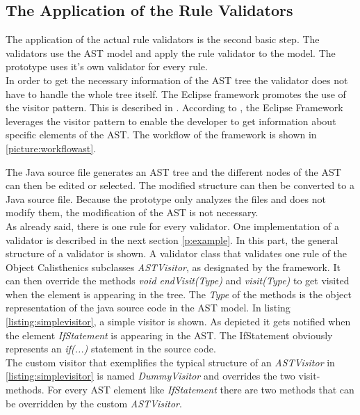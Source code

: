 \subsection*{The Application of the Rule Validators}
\label{astvisitorexample}
The application of the actual rule validators is the second basic step. The validators use the \ac{AST} model and apply the rule validator to the model. The prototype uses it's own validator for every rule. 
\\

In order to get the necessary information of the \ac{AST} tree the validator does not have to handle the whole tree itself. The Eclipse framework promotes the use of the visitor pattern. This is described in \cite[p. 366]{gof}. According to \cite{eclipseast}, the Eclipse Framework leverages the visitor pattern to enable the developer to get information about specific elements of the \ac{AST}. The workflow of the framework is shown in \ref{picture:workflowast}. 

The Java source file generates an \ac{AST} tree and the different nodes of the \ac{AST} can then be edited or selected. The modified structure can then be converted to a Java source file. Because the prototype only analyzes the files and does not modify them, the modification of the \ac{AST} is not necessary. 
\\

As already said, there is one rule for every validator. One implementation of a validator is described in the next section \ref{p:example}. In this part, the general structure of a validator is shown. A validator class that validates one rule of the Object Calisthenics subclasses \textit{ASTVisitor}, as designated by the framework. It can then override the methods \textit{void endVisit(Type)} and \textit{visit(Type)} to get visited when the element is appearing in the tree. The \textit{Type} of the methods is the object representation of the java source code in the \ac{AST} model. In listing \ref{listing:simplevisitor}, a simple visitor is shown. As depicted it gets notified when the element \textit{IfStatement} is appearing in the \ac{AST}. The IfStatement obviously represents an \textit{if(...)} statement in the source code. 
\\

The custom visitor that exemplifies the typical structure of an \textit{ASTVisitor} in \ref{listing:simplevisitor} is named \textit{DummyVisitor} and overrides the two visit-methods.
For every \ac{AST} element like \textit{IfStatement} there are two methods that can be overridden by the custom \textit{ASTVisitor}. 
\\

